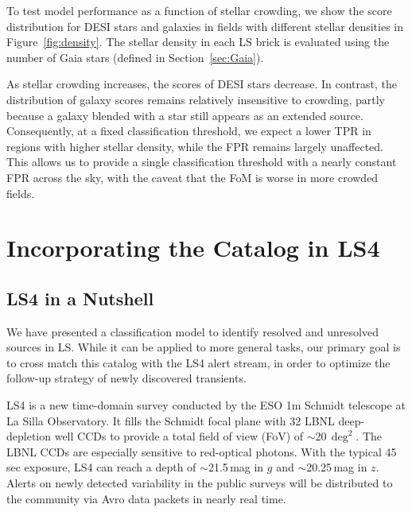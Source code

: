 \documentclass[twocolumn]{aastex631}
\begin{document}
\begin{CJK*}{UTF8}{gbsn}
To test model performance as a function of stellar crowding, we show the score distribution for DESI stars and galaxies in fields with different stellar densities in Figure~\ref{fig:density}. The stellar density in each LS brick is evaluated using the number of Gaia stars (defined in Section~\ref{sec:Gaia}).

As stellar crowding increases, the scores of DESI stars decrease. In contrast, the distribution of galaxy scores remains relatively insensitive to crowding, partly because a galaxy blended with a star still appears as an extended source. Consequently, at a fixed classification threshold, we expect a lower TPR in regions with higher stellar density, while the FPR remains largely unaffected. This allows us to provide a single classification threshold with a nearly constant FPR across the sky, with the caveat that the FoM is worse in more crowded fields.

\section{Incorporating the Catalog in LS4}\label{sec:pipeline}
\subsection{LS4 in a Nutshell}
We have presented a classification model to identify resolved and unresolved sources in LS. While it can be applied to more general tasks, our primary goal is to cross match this catalog with the LS4 alert stream, in order to optimize the follow-up strategy of newly discovered transients.

LS4 \citep{LS4_2025} is a new time-domain survey conducted by the ESO 1m Schmidt telescope at La Silla Observatory. It fills the Schmidt focal plane with 32 LBNL deep-depletion well CCDs to provide a total field of view (FoV) of $\sim$20\,$\deg^2$. The LBNL CCDs are especially sensitive to red-optical photons. With the typical 45\,sec exposure, LS4 can reach a depth of $\sim$21.5\,mag in $g$ and $\sim$20.25\,mag in $z$. 
Alerts on newly detected variability in the public surveys will be distributed to the community via Avro data packets in nearly real time.


\end{CJK*}
\end{document}
